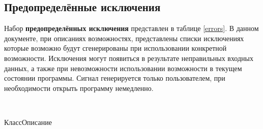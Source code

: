 \subsection{Предопределённые исключения}

Набор {\bf предопределённых исключения} представлен в таблице \ref{errors}. В данном документе, при описаниях возможностях, представлены списки исключениях которые возможно будут сгенерированы при использовании конкретной возможности. Исключения могут появиться в результате неправильных входных данных, а также при невозможности использовании возможности в текущем состоянии программы. Сигнал  генерируется только пользователем, при необходимости открыть программу немедленно.

\ 

%
{Класс}{Описание}%
